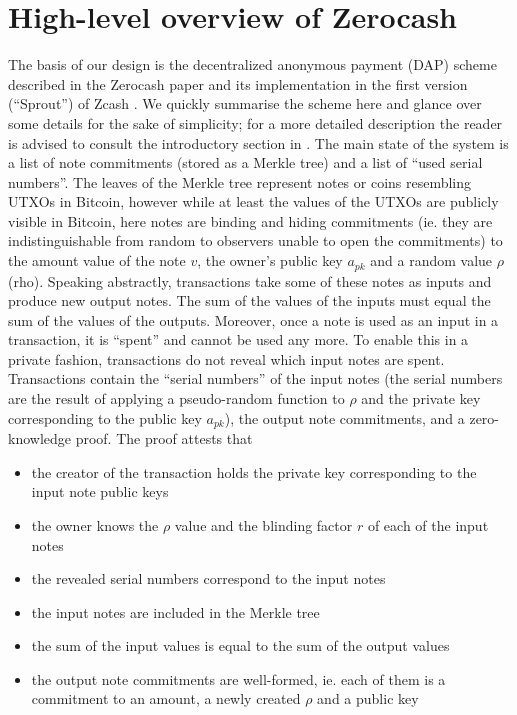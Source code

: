 \documentclass{article}
\begin{document}
\section{High-level overview of Zerocash}

The basis of our design is the decentralized anonymous payment (DAP) scheme described in the Zerocash paper \cite{zerocash} and its implementation in the first version (``Sprout'') of Zcash \cite{zcash}. We quickly summarise the scheme here and glance over some details for the sake of simplicity; for a more detailed description the reader is advised to consult the introductory section in \cite{zerocash}. The main state of the system is a list of note commitments (stored as a Merkle tree) and a list of ``used serial numbers''. The leaves of the Merkle tree represent notes or coins resembling UTXOs in Bitcoin, however while at least the values of the UTXOs are publicly visible in Bitcoin, here notes are binding and hiding commitments (ie. they are indistinguishable from random to observers unable to open the commitments) to the amount value of the note $v$, the owner's public key $a_{pk}$ and a random value $\rho$ (rho). Speaking abstractly, transactions take some of these notes as inputs and produce new output notes. The sum of the values of the inputs must equal the sum of the values of the outputs. Moreover, once a note is used as an input in a transaction, it is ``spent'' and cannot be used any more. To enable this in a private fashion, transactions do not reveal which input notes are spent. Transactions contain the ``serial numbers'' of the input notes (the serial numbers are the result of applying a pseudo-random function to $\rho$ and the private key corresponding to the public key $a_{pk}$), the output note commitments, and a zero-knowledge proof. The proof attests that
\begin{itemize}
\item the creator of the transaction holds the private key corresponding to the input note public keys
\item the owner knows the $\rho$ value and the blinding factor $r$ of each of the input notes
\item the revealed serial numbers correspond to the input notes
\item the input notes are included in the Merkle tree
\item the sum of the input values is equal to the sum of the output values
\item the output note commitments are well-formed, ie. each of them is a commitment to an amount, a newly created $\rho$ and a public key
\end{itemize}
\end{document}
